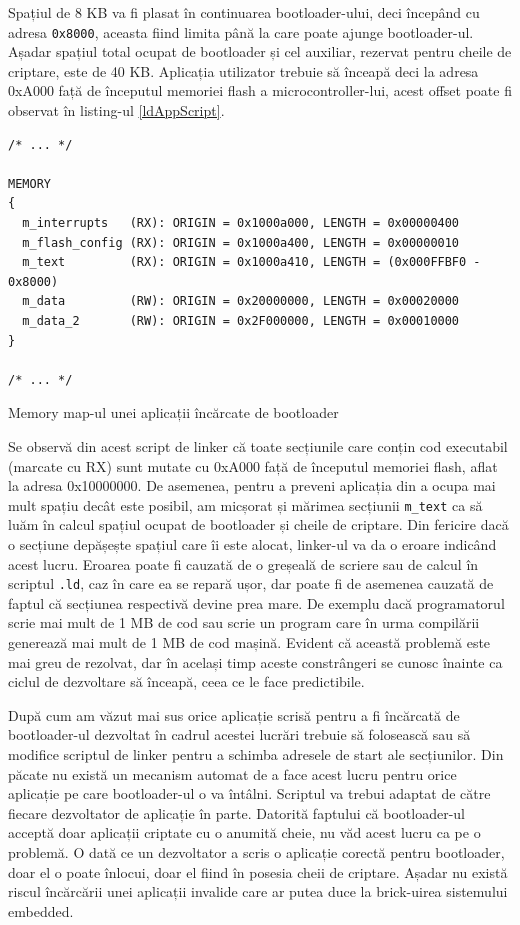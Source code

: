 \documentclass[12pt,a4paper,titlepage]{report}
\begin{document}
Spațiul de 8 KB va fi plasat în continuarea bootloader-ului, deci începând cu adresa \texttt{0x8000}, aceasta fiind limita până la care poate ajunge bootloader-ul. Așadar spațiul total ocupat de bootloader și cel auxiliar, rezervat pentru cheile de criptare, este de 40 KB. Aplicația utilizator trebuie să înceapă deci la adresa 0xA000 față de începutul memoriei flash a microcontroller-lui, acest offset poate fi observat în listing-ul \ref{ldAppScript}.

\begin{listing}[h]
\begin{verbatim}
/* ... */

MEMORY
{
  m_interrupts   (RX): ORIGIN = 0x1000a000, LENGTH = 0x00000400
  m_flash_config (RX): ORIGIN = 0x1000a400, LENGTH = 0x00000010
  m_text         (RX): ORIGIN = 0x1000a410, LENGTH = (0x000FFBF0 - 0x8000)
  m_data         (RW): ORIGIN = 0x20000000, LENGTH = 0x00020000
  m_data_2       (RW): ORIGIN = 0x2F000000, LENGTH = 0x00010000
}

/* ... */
\end{verbatim}

\caption{Memory map-ul unei aplicații încărcate de bootloader}
\label{ldAppScript}
\end{listing}

Se observă din acest script de linker că toate secțiunile care conțin cod executabil (marcate cu RX) sunt mutate cu 0xA000 față de începutul memoriei flash, aflat la adresa 0x10000000. De asemenea, pentru a preveni aplicația din a ocupa mai mult spațiu decât este posibil, am micșorat și mărimea secțiunii \texttt{m\_text} ca să luăm în calcul spațiul ocupat de bootloader și cheile de criptare. Din fericire dacă o secțiune depășește spațiul care îi este alocat, linker-ul va da o eroare indicând acest lucru. Eroarea poate fi cauzată de o greșeală de scriere sau de calcul în scriptul \texttt{.ld}, caz în care ea se repară ușor, dar poate fi de asemenea cauzată de faptul că secțiunea respectivă devine prea mare. De exemplu dacă programatorul scrie mai mult de 1 MB de cod sau scrie un program care în urma compilării generează mai mult de 1 MB de cod mașină. Evident că această problemă este mai greu de rezolvat, dar în același timp aceste constrângeri se cunosc înainte ca ciclul de dezvoltare să înceapă, ceea ce le face predictibile.

După cum am văzut mai sus orice aplicație scrisă pentru a fi încărcată de bootloader-ul dezvoltat în cadrul acestei lucrări trebuie să folosească sau să modifice scriptul de linker pentru a schimba adresele de start ale secțiunilor. Din păcate nu există un mecanism automat de a face acest lucru pentru orice aplicație pe care bootloader-ul o va întâlni. Scriptul va trebui adaptat de către fiecare dezvoltator de aplicație în parte. Datorită faptului că bootloader-ul acceptă doar aplicații criptate cu o anumită cheie, nu văd acest lucru ca pe o problemă. O dată ce un dezvoltator a scris o aplicație corectă pentru bootloader, doar el o poate înlocui, doar el fiind în posesia cheii de criptare. Așadar nu există riscul încărcării unei aplicații invalide care ar putea duce la brick-uirea sistemului embedded.
\end{document}
